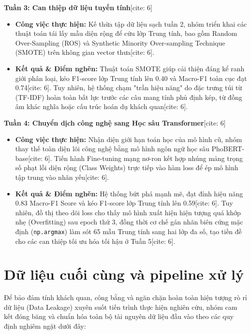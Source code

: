 \documentclass[conference,10pt,a4paper]{IEEEtran}
\begin{document}
\noindent \textbf{Tuần 3: Can thiệp dữ liệu tuyến tính}[cite: 6]
\begin{itemize}
    \item \textbf{Công việc thực hiện:} Kế thừa tập dữ liệu sạch tuần 2, nhóm triển khai các thuật toán tái lấy mẫu diện rộng để cứu lớp Trung tính, bao gồm Random Over-Sampling (ROS) và Synthetic Minority Over-sampling Technique (SMOTE) trên không gian vector thưa[cite: 6].
    \item \textbf{Kết quả \& Điểm nghẽn:} Thuật toán SMOTE giúp cải thiện đáng kể ranh giới phân loại, kéo F1-score lớp Trung tính lên 0.40 và Macro-F1 toàn cục đạt 0.74[cite: 6]. Tuy nhiên, hệ thống chạm "trần hiệu năng" do đặc trưng túi từ (TF-IDF) hoàn toàn bất lực trước các câu mang tính phủ định kép, từ đồng âm khác nghĩa hoặc cấu trúc hoán dụ khách quan[cite: 6].
\end{itemize}

\noindent \textbf{Tuần 4: Chuyển dịch công nghệ sang Học sâu Transformer}[cite: 6]
\begin{itemize}
    \item \textbf{Công việc thực hiện:} Nhận diện giới hạn toán học của mô hình cũ, nhóm thay thế toàn diện lõi công nghệ bằng mô hình ngôn ngữ học sâu PhoBERT-base[cite: 6]. Tiến hành Fine-tuning mạng nơ-ron kết hợp nhúng mảng trọng số phạt lỗi diện rộng (Class Weights) trực tiếp vào hàm loss để ép mô hình tập trung vào nhãn yếu[cite: 6].
    \item \textbf{Kết quả \& Điểm nghẽn:} Hệ thống bứt phá mạnh mẽ, đạt đỉnh hiệu năng 0.83 Macro-F1 Score và kéo F1-score lớp Trung tính lên 0.59[cite: 6]. Tuy nhiên, đồ thị theo dõi loss cho thấy mô hình xuất hiện hiện tượng quá khớp nhẹ (Overfitting) sau epoch thứ 3, đồng thời cơ chế gán nhãn biên cứng mặc định (\texttt{np.argmax}) làm sót 65 mẫu Trung tính sang hai lớp đa số, tạo tiền đề cho các can thiệp tối ưu hóa tối hậu ở Tuần 5[cite: 6].
\end{itemize}

\section{Dữ liệu cuối cùng và pipeline xử lý}
Để bảo đảm tính khách quan, công bằng và ngăn chặn hoàn toàn hiện tượng rò rỉ dữ liệu (Data Leakage) xuyên suốt tiến trình thực hiện nghiên cứu, nhóm cam kết đóng băng và chuẩn hóa toàn bộ tài nguyên dữ liệu đầu vào theo các quy định nghiêm ngặt dưới đây:
\end{document}
